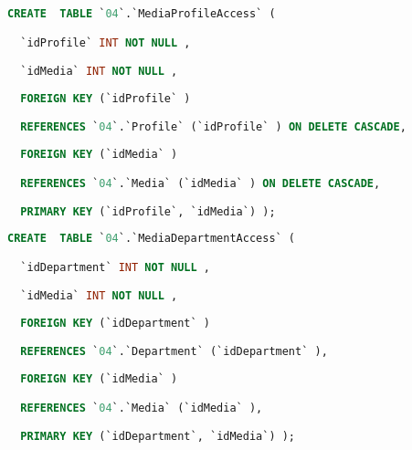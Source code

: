 \begin{Code}
\begin{lstlisting}[language=SQL,breaklines=true, label=createMediaProfileAccess, caption=Create MediaProfileAccess, ]
CREATE  TABLE `04`.`MediaProfileAccess` (

  `idProfile` INT NOT NULL ,

  `idMedia` INT NOT NULL ,
  
  FOREIGN KEY (`idProfile` )

  REFERENCES `04`.`Profile` (`idProfile` ) ON DELETE CASCADE,
  
  FOREIGN KEY (`idMedia` )

  REFERENCES `04`.`Media` (`idMedia` ) ON DELETE CASCADE,

  PRIMARY KEY (`idProfile`, `idMedia`) );

\end{lstlisting}
\end{Code}

\begin{Code}
\begin{lstlisting}[language=SQL,breaklines=true, label=createMediaDepartmentAccess, caption=Create MediaDepartmentAccess, ]
CREATE  TABLE `04`.`MediaDepartmentAccess` (

  `idDepartment` INT NOT NULL ,

  `idMedia` INT NOT NULL ,
  
  FOREIGN KEY (`idDepartment` )

  REFERENCES `04`.`Department` (`idDepartment` ),
  
  FOREIGN KEY (`idMedia` )

  REFERENCES `04`.`Media` (`idMedia` ),

  PRIMARY KEY (`idDepartment`, `idMedia`) );

\end{lstlisting}
\end{Code}
